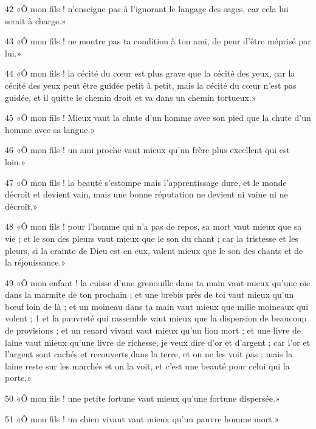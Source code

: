 \par 42 «Ô mon fils ! n'enseigne pas à l'ignorant le langage des sages, car cela lui serait à charge.»

\par 43 «Ô mon fils ! ne montre pas ta condition à ton ami, de peur d'être méprisé par lui.»

\par 44 «Ô mon fils ! la cécité du cœur est plus grave que la cécité des yeux, car la cécité des yeux peut être guidée petit à petit, mais la cécité du cœur n'est pas guidée, et il quitte le chemin droit et va dans un chemin tortueux.»

\par 45 «Ô mon fils ! Mieux vaut la chute d'un homme avec son pied que la chute d'un homme avec sa langue.»

\par 46 «Ô mon fils ! un ami proche vaut mieux qu'un frère plus excellent qui est loin.»

\par 47 «Ô mon fils ! la beauté s'estompe mais l'apprentissage dure, et le monde décroît et devient vain, mais une bonne réputation ne devient ni vaine ni ne décroît.»

\par 48 «Ô mon fils ! pour l'homme qui n'a pas de repos, sa mort vaut mieux que sa vie ; et le son des pleurs vaut mieux que le son du chant ; car la tristesse et les pleurs, si la crainte de Dieu est en eux, valent mieux que le son des chants et de la réjouissance.»

\par 49 «Ô mon enfant ! la cuisse d'une grenouille dans ta main vaut mieux qu'une oie dans la marmite de ton prochain ; et une brebis près de toi vaut mieux qu'un bœuf loin de là ; et un moineau dans ta main vaut mieux que mille moineaux qui volent ; 1 et la pauvreté qui rassemble vaut mieux que la dispersion de beaucoup de provisions ; et un renard vivant vaut mieux qu'un lion mort ; et une livre de laine vaut mieux qu'une livre de richesse, je veux dire d'or et d'argent ; car l'or et l'argent sont cachés et recouverts dans la terre, et on ne les voit pas ; mais la laine reste sur les marchés et on la voit, et c'est une beauté pour celui qui la porte.»

\par 50 «Ô mon fils ! une petite fortune vaut mieux qu'une fortune dispersée.»

\par 51 «Ô mon fils ! un chien vivant vaut mieux qu'un pauvre homme mort.»

